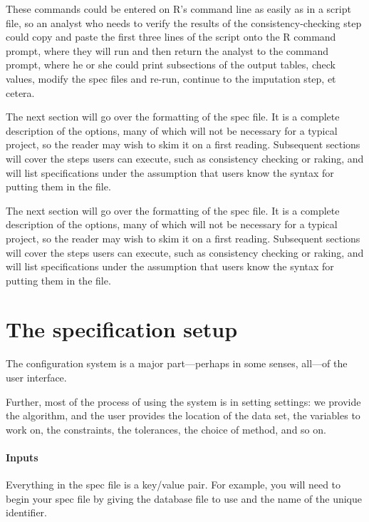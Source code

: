 \documentclass{article}
\begin{document}
These commands could be entered on R's command line as easily as in a script file, so an
analyst who needs to verify the results of the consistency-checking step could copy and
paste the first three lines of the script onto the R command prompt, where they will run and
then return the analyst to the command prompt, where he or she could print subsections of
the output tables, check values, modify the spec files and re-run, continue to the
imputation step, et cetera.

The next section will go over the formatting of the spec file. It is a complete
description of the options, many of which will not be necessary for a typical project, so
the reader may wish to skim it on a first reading. Subsequent sections will cover the 
steps users can execute, such as consistency checking or raking, and will list
specifications under the assumption that users know the syntax for putting them in the
file.

The next section will go over the formatting of the spec file. It is a complete
description of the options, many of which will not be necessary for a typical project, so
the reader may wish to skim it on a first reading. Subsequent sections will cover the 
steps users can execute, such as consistency checking or raking, and will list
specifications under the assumption that users know the syntax for putting them in the
file.


\section{The specification setup}\label{specsyntax}
The configuration system is a major part---perhaps in some senses, all---of the
user interface. 

Further, most of the process of using the system is in setting
settings: we provide the algorithm, and the user provides the location of the
data set, the variables to work on, the constraints, the tolerances, the choice
of method, and so on. 

\paragraph{Inputs} 
Everything in the spec file is a key/value pair. For example, you will need to begin
your spec file by giving the database file to use and the name of the unique identifier.
\end{document}
